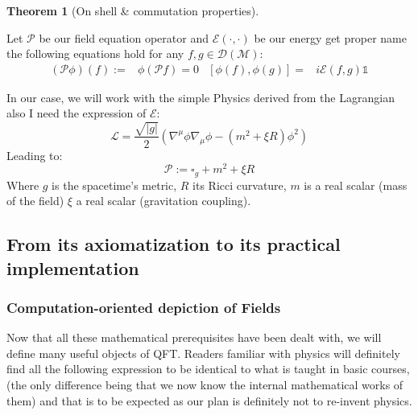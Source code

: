 \documentclass[a4paper,11pt]{article}
\numberwithin{equation}{section}
\theoremstyle{definition}
\newtheorem{theorem}{Theorem}
\begin{document}
        \begin{theorem}[On shell & commutation properties]$\quad$
        
        Let $\mathcal{P}$ be our field equation operator and $\mathcal{E}(\cdot,\cdot)$ be our energy \color{red} get proper name\color{black} the following equations hold for any $f,g\in\mathcal{D}(\mathcal{M})$:
        \begin{align*}
            (\mathcal{P}\phi)(f):=&\phi(\mathcal{P}f)=0 &
            [\phi(f),\phi(g)]=&i\mathcal{E}(f,g)\mathds{1}
        \end{align*}            
        \end{theorem}

        In our case, we will work with the simple Physics derived from the Lagrangian \color{red} also I need the expression of $\mathcal{E}$\color{black}:
        $$\mathcal{L}=\frac{\sqrt{|g|}}{2}\left(\nabla^\mu\phi\nabla_\mu\phi- (m^2+\xi R)\phi^2\right)$$
        Leading to:
        $$\mathcal{P}:=\square_g + m^2 + \xi R$$
        Where $g$ is the spacetime's metric, $R$ its Ricci curvature, $m$ is a real scalar (mass of the field) $\xi$ a real scalar (gravitation coupling).

        
\subsection{From its axiomatization to its practical implementation}
\subsubsection{Computation-oriented depiction of Fields}
        Now that all these mathematical prerequisites have been dealt with, we will define many useful objects of QFT. Readers familiar with physics will definitely find all the following expression to be identical to what is taught in basic courses, (the only difference being that we now know the internal mathematical works of them) and that is to be expected as our plan is definitely not to re-invent physics.
\end{document}
